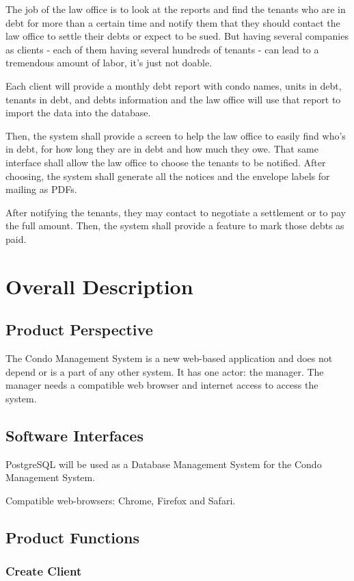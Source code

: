 \documentclass{scrreprt}
\begin{document}
The job of the law office is to look at the reports and find the tenants who are in debt for more than a certain time and notify them that they should contact the law office to settle their debts or expect to be sued. But having several companies as clients - each of them having several hundreds of tenants - can lead to a tremendous amount of labor, it’s just not doable.

Each client will provide a monthly debt report with condo names, units in debt, tenants in debt, and debts information and the law office will use that report to import the data into the database.

Then, the system shall provide a screen to help the law office to easily find who’s in debt, for how long they are in debt and how much they owe. That same interface shall allow the law office to choose the tenants to be notified. After choosing, the system shall generate all the notices and the envelope labels for mailing as PDFs.

After notifying the tenants, they may contact to negotiate a settlement or to pay the full amount. Then, the system shall provide a feature to mark those debts as paid.

\chapter{Overall Description}

\section{Product Perspective}
The Condo Management System is a new web-based application and does not depend or is a part of any other system. It has one actor: the manager. The manager needs a compatible web browser and internet access to access the system.

\section{Software Interfaces}
PostgreSQL will be used as a Database Management System for the Condo Management System.

Compatible web-browsers: Chrome, Firefox and Safari.

\section{Product Functions}

\subsection{Create Client}
\end{document}
